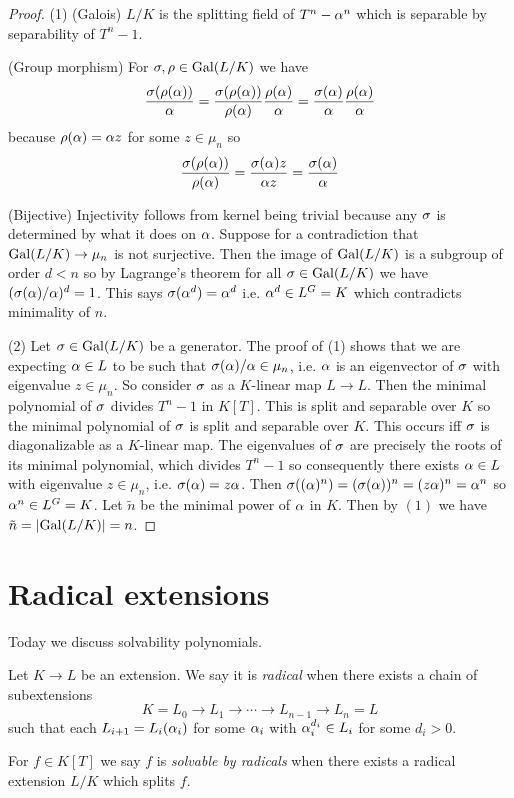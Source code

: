 \documentclass{article}
\begin{document}
\begin{proof}
  (1) (Galois)
  $L / K$ is the splitting field of $T^n - \alpha^n$
  which is separable by separability of $T^n - 1$.

  (Group morphism)
  For $\sigma , \rho \in \operatorname{Gal}(L / K)$
  we have \[
    \frac{\sigma(\rho(\alpha))}{\alpha} 
    = \frac{\sigma(\rho(\alpha))}{\rho(\alpha)} \frac{\rho(\alpha)}{\alpha}
    = \frac{\sigma(\alpha)}{\alpha} \frac{\rho(\alpha)}{\alpha}
  \]
  because $\rho(\alpha) = \alpha z$ for some $z \in \mu_n$ so \[
    \frac{\sigma(\rho(\alpha))}{\rho(\alpha)}
    = \frac{\sigma(\alpha) z}{\alpha z} = \frac{\sigma(\alpha)}{\alpha}
  \]

  (Bijective)
  Injectivity follows from kernel being trivial
  because any $\sigma$ is determined by what it does on $\alpha$.
  Suppose for a contradiction that $\operatorname{Gal}(L / K) \to \mu_n$ is not surjective.
  Then the image of $\operatorname{Gal}(L / K)$ is a subgroup of order $d < n$
  so by Lagrange's theorem 
  for all $\sigma \in \operatorname{Gal}(L / K)$ we have $(\sigma(\alpha) / \alpha)^d = 1$.
  This says $\sigma(\alpha^d) = \alpha^d$ i.e. $\alpha^d \in L^G = K$
  which contradicts minimality of $n$.

  (2) Let $\sigma \in \operatorname{Gal}(L / K)$ be a generator.
  The proof of (1) shows that we are expecting
  $\alpha \in L$ to be such that $\sigma(\alpha) / \alpha \in \mu_n$,
  i.e. $\alpha$ is an eigenvector of $\sigma$ with eigenvalue $z \in \mu_n$.
  So consider $\sigma$ as a $K$-linear map $L \to L$.
  Then the minimal polynomial of $\sigma$ divides $T^n - 1$ in $K[T]$.
  This is split and separable over $K$ so 
  the minimal polynomial of $\sigma$ is split and separable over $K$.
  This occurs iff $\sigma$ is diagonalizable as a $K$-linear map.
  The eigenvalues of $\sigma$ are precisely the roots of its minimal polynomial,
  which divides $T^n - 1$ so
  consequently there exists $\alpha \in L$ with
  eigenvalue $z \in \mu_n$, i.e. $\sigma(\alpha) = z \alpha$.
  Then $\sigma((\alpha)^n) = (\sigma(\alpha))^n = (z \alpha)^n = \alpha^n$ so $\alpha^n \in L^G = K$.
  Let $\tilde{n}$ be the minimal power of $\alpha$ in $K$.
  Then by $(1)$ we have $\tilde{n} = \left\vert \operatorname{Gal}(L / K) \right\vert = n$.
\end{proof}

\section{Radical extensions}

Today we discuss solvability polynomials.

\begin{dfn}

  Let $K \to L$ be an extension.
  We say it is \emph{radical} when
  there exists a chain of subextensions 
  \[
    K = L_0 \to L_1 \to \cdots \to L_{n-1} \to L_n = L
  \]
  such that each $L_{i+1} = L_i(\alpha_i)$
  for some $\alpha_i$ with $\alpha_i^{d_i} \in L_i$ for some $d_i > 0$.

  For $f \in K[T]$ we say $f$ is \emph{solvable by radicals} when
  there exists a radical extension $L / K$ which splits $f$.
\end{dfn}
\end{document}
